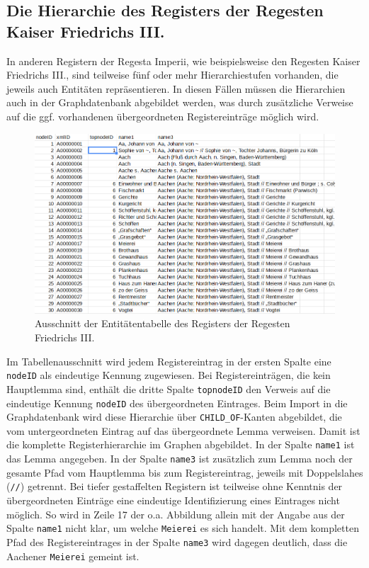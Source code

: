 \documentclass[ngerman,]{scrreprt}
\begin{document}
\subsection{Die Hierarchie des Registers der Regesten Kaiser Friedrichs III.}\label{die-hierarchie-des-registers-der-regesten-kaiser-friedrichs-iii.}

In anderen Registern der Regesta Imperii, wie beispielsweise den Regesten Kaiser Friedrichs III., sind teilweise fünf oder mehr Hierarchiestufen vorhanden, die jeweils auch Entitäten repräsentieren. In diesen Fällen müssen die Hierarchien auch in der Graphdatenbank abgebildet werden, was durch zusätzliche Verweise auf die ggf. vorhandenen übergeordneten Registereinträge möglich wird.

\begin{figure}
\centering
\includegraphics{Bilder/RI2Graph/RegisterF3-Hierarchie.png}
\caption{Ausschnitt der Entitätentabelle des Registers der Regesten Friedrichs III.}
\end{figure}

Im Tabellenausschnitt wird jedem Registereintrag in der ersten Spalte eine \texttt{nodeID} als eindeutige Kennung zugewiesen. Bei Registereinträgen, die kein Hauptlemma sind, enthält die dritte Spalte \texttt{topnodeID} den Verweis auf die eindeutige Kennung \texttt{nodeID} des übergeordneten Eintrages. Beim Import in die Graphdatenbank wird diese Hierarchie über \texttt{CHILD\_OF}-Kanten abgebildet, die vom untergeordneten Eintrag auf das übergeordnete Lemma verweisen. Damit ist die komplette Registerhierarchie im Graphen abgebildet. In der Spalte \texttt{name1} ist das Lemma angegeben. In der Spalte \texttt{name3} ist zusätzlich zum Lemma noch der gesamte Pfad vom Hauptlemma bis zum Registereintrag, jeweils mit Doppelslahes (\texttt{//}) getrennt. Bei tiefer gestaffelten Registern ist teilweise ohne Kenntnis der übergeordneten Einträge eine eindeutige Identifizierung eines Eintrages nicht möglich. So wird in Zeile 17 der o.a. Abbildung allein mit der Angabe aus der Spalte \texttt{name1} nicht klar, um welche \texttt{Meierei} es sich handelt. Mit dem kompletten Pfad des Registereintrages in der Spalte \texttt{name3} wird dagegen deutlich, dass die Aachener \texttt{Meierei} gemeint ist.
\end{document}
